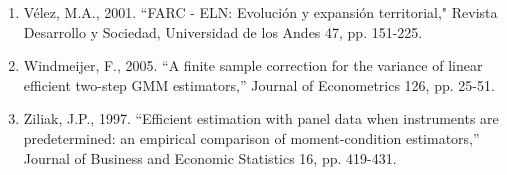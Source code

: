 \documentclass[12pt,a4paper,english]{article}%
\begin{document}
\begin{enumerate}
\item V\'{e}lez, M.A., 2001. ``FARC - ELN: Evoluci\'{o}n y expansi\'{o}n territorial," Revista Desarrollo y Sociedad, Universidad de los Andes 47, pp. 151-225.

\item Windmeijer, F., 2005. ``A finite sample correction for the variance of linear efficient two-step GMM estimators,'' Journal of Econometrics 126, pp. 25-51.

\item  Ziliak, J.P., 1997. ``Efficient estimation with panel data when instruments are predetermined: an empirical comparison of moment-condition estimators,'' Journal of Business and Economic Statistics 16, pp. 419-431.

\end{enumerate}


\end{document}
